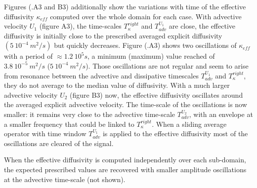Figures (.A3 and B3) additionally show the variations with time of the effective diffusivity $\kappa_{eff}$ computed over the whole domain for each case. 
With advective velocity $U_1$ (figure A3), the time-scales $T_{\kappa}^{right}$ and $T_{adv}^{U_1}$ are close, the effective diffusivity is initially close to the prescribed averaged explicit diffusivity $(5 \ 10^{-4} \ m^2/s)$ but quickly decreases. Figure (.A3) shows two oscillations of $\kappa_{eff}$ with a period of $\approx 1.2 \ 10^5s$, a minimum (maximum) value reached of $3.8 \ 10^{-5} \ m^2/s$ ($5 \ 10^{-4} \ m^2/s$). Those oscillations are not regular and seem to arise from resonance between the advective and dissipative timescales $T_{adv}^{U_1}$ and $T_{\kappa}^{right}$, they do not average to the median value of diffusivity.
With a much larger advective velocity $U_2$ (figure B3) now, the effective diffusivity oscillates around the averaged explicit advective velocity. The time-scale of the oscillations is now smaller: it remains very close to the advective time-scale $T_{adv}^{U_2}$, with an envelope at a smaller frequency that could be linked to $T_{\kappa}^{right}$. When a sliding average operator with time window $T_{adv}^{U_1}$ is applied to the effective diffusivity most of the oscillations are cleared of the signal.

When the effective diffusivity is computed independently over each sub-domain, the expected prescribed values are recovered with smaller amplitude oscillations at the advective time-scale (not shown).

